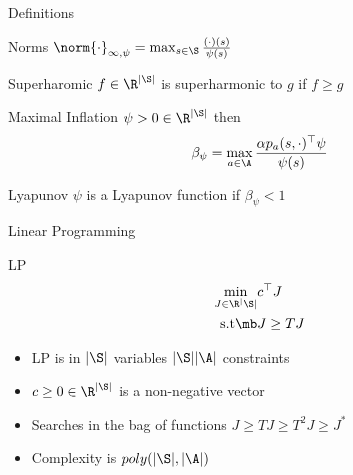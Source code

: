 \documentclass[10pt]{beamer}
\begin{document}
\begin{frame}[fragile]{Definitions}
\begin{block}{Norms}
$\norm{\cdot}_{\infty,\psi}=\max_{s\in \S}\frac{(\cdot)(s) }{\psi(s)}$
\end{block}


\begin{block}{Superharomic}
$f\in \R^{|\S|}$ is superharmonic to $g$ if $f\geq g$
\end{block}


\begin{block}{Maximal Inflation}
$\psi>0\in \R^{|\S|}$ then
\begin{align*}
\beta_\psi=\max_{a\in \A}\frac{\alpha p_a(s,\cdot)^\top \psi}{\psi(s)}
\end{align*}
\end{block}

\begin{block}{Lyapunov}
$\psi$ is a Lyapunov function if $\beta_\psi<1$
\end{block}


\end{frame}




\begin{frame}[fragile]{Linear Programming}
\begin{block}{LP \cite{BertB}}
\begin{align*}
\min_{J\in \R^|\S|} &c^\top J\\
\text{s.t}\mb &J\geq T J
\end{align*}
\end{block}

\begin{itemize}
\item LP is in $|\S|$ variables $|\S||\A|$ constraints
\item $c\geq 0 \in \R^{|\S|}$ is a non-negative vector
\item Searches in the bag of {\color{orange}{superharmonic}} functions $J\geq TJ\geq T^2J\geq J^*$
\item Complexity is $poly(|\S|,|\A|)$
\end{itemize}
\end{frame}
\end{document}
